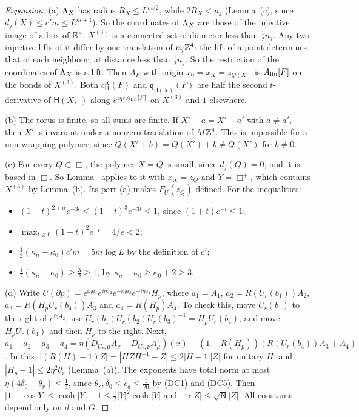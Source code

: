 \begin{proof}[Expansion]
(a) $\Lambda_X$ has radius $R_X\le L^{m/2}$, while $2R_X<n_j$ (Lemma~(c), since $d_j(X)\le c'm\le L^{m+1}$). So the coordinates of $\Lambda_X$ are those of the injective image of a box of $\mathbb R^4$. $X^{(3)}$ is a connected set of diameter less than $\frac12n_j$. Any two injective lifts of it differ by one translation of $n_j\mathbb Z^4$: the lift of a point determines that of each neighbour, at distance less than $\frac12n_j$. So the restriction of the coordinates of $\Lambda_X$ is a lift. Then $A_F$ with origin $x_0=x_X=z_{Q(X)}$ is $A_{\rm lin}[F]$ on the bonds of $X^{(3)}$. Both $c^X_{\mathsf H}(F)$ and $\mathfrak q_{\mathsf H(X)}(F)$ are half the second $t$-derivative of $\mathsf H(X,\cdot)$ along $e^{\mathrm i\eta tA_{\rm lin}[F]}$ on $X^{(3)}$ and $1$ elsewhere.

(b) The torus is finite, so all sums are finite. If $X'-a=X'-a'$ with $a\ne a'$, then $X'$ is invariant under a nonzero translation of $M\mathbb Z^4$. This is impossible for a non-wrapping polymer, since $Q(X'+b)=Q(X')+b\ne Q(X')$ for $b\ne0$.

(c) For every $Q\subset\Box$, the polymer $X=Q$ is small, since $d_j(Q)=0$, and it is based in $\Box$. So Lemma~ applies to it with $x_X=z_Q$ and $Y=\Box^+$, which contains $X^{(3)}$ by Lemma~(b). Its part (a) makes $F_U(z_Q)$ defined. For the inequalities:
\begin{itemize}
\item $(1+t)^{2+\alpha}e^{-3t}\le(1+t)^3e^{-3t}\le1$, since $(1+t)e^{-t}\le1$;
\item $\max_{t\ge0}(1+t)^2e^{-t}=4/e<2$;
\item $\frac12(\kappa_n-\kappa_0)c'm=5m\log L$ by the definition of $c'$;
\item $\frac12(\kappa_n-\kappa_0)\ge\frac32\ge1$, by $\kappa_n-\kappa_0\ge\kappa_0+2\ge3$.
\end{itemize}

(d) Write $U(\partial p)=e^{\ii\eta a_1}e^{\ii\eta a_2}e^{-\ii\eta a_3}e^{-\ii\eta a_4}H_p$, where $a_1=A_1$, $a_2=R(U_r(b_1))A_2$, $a_3=R(H_pU_r(b_4))A_3$ and $a_4=R(H_p)A_4$. To check this, move $U_r(b_1)$ to the right of $e^{\ii\eta A_2}$, use $U_r(b_1)U_r(b_2)U_r(b_3)^{-1}=H_pU_r(b_4)$, and move $H_pU_r(b_4)$ and then $H_p$ to the right. Next, $a_1+a_2-a_3-a_4=\eta(D_{U_r,\mu}A_\nu-D_{U_r,\nu}A_\mu)(x)+(1-R(H_p))(R(U_r(b_4))A_3+A_4)$. In this, $|(R(H)-1)Z|=|HZH^{-1}-Z|\le2|H-1||Z|$ for unitary $H$, and $|H_p-1|\le2\eta^2\theta_r$ (Lemma~(a)). The exponents have total norm at most $\eta(4\delta_0+\theta_r)\le\frac14$, since $\theta_r,\delta_0\le c_a\le\frac1{20}$ by (DC1) and (DC5). Then $|1-\cos Y|\le\cosh|Y|-1\le\frac12|Y|^2\cosh|Y|$ and $|\operatorname{tr}Z|\le\sqrt{\mathsf N}|Z|$. All constants depend only on $d$ and $G$.


\end{proof}
